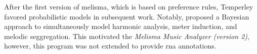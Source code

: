 After the first version of \gls{melisma}, which is based on
preference rules, Temperley favored probabilistic models in
subsequent work. Notably, \textcite{temperley2009unified}
proposed a Bayesian approach to simultaneously model
harmonic analysis, meter induction, and melodic
seggregation. This motivated the \emph{Melisma Music
Analyzer (version
2)},
however, this program was not extended to provide \gls{rna}
annotations.




